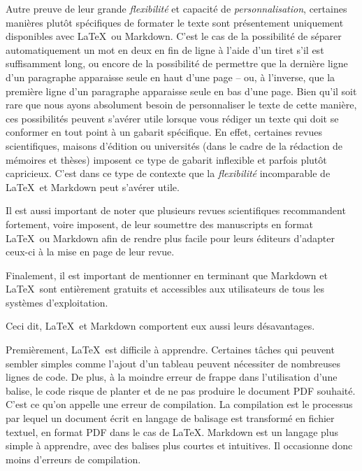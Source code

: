 \documentclass[
  letterpaper,
]{scrbook}
\begin{document}
Autre preuve de leur grande \emph{flexibilité} et capacité de
\emph{personnalisation}, certaines manières plutôt spécifiques de
formater le texte sont présentement uniquement disponibles avec
\LaTeX~ou Markdown. C'est le cas de la possibilité de séparer
automatiquement un mot en deux en fin de ligne à l'aide d'un tiret s'il
est suffisamment long, ou encore de la possibilité de permettre que la
dernière ligne d'un paragraphe apparaisse seule en haut d'une page --
ou, à l'inverse, que la première ligne d'un paragraphe apparaisse seule
en bas d'une page. Bien qu'il soit rare que nous ayons absolument besoin
de personnaliser le texte de cette manière, ces possibilités peuvent
s'avérer utile lorsque vous rédiger un texte qui doit se conformer en
tout point à un gabarit spécifique. En effet, certaines revues
scientifiques, maisons d'édition ou universités (dans le cadre de la
rédaction de mémoires et thèses) imposent ce type de gabarit inflexible
et parfois plutôt capricieux. C'est dans ce type de contexte que la
\emph{flexibilité} incomparable de \LaTeX~et Markdown peut s'avérer
utile.

Il est aussi important de noter que plusieurs revues scientifiques
recommandent fortement, voire imposent, de leur soumettre des
manuscripts en format \LaTeX~ou Markdown afin de rendre plus facile pour
leurs éditeurs d'adapter ceux-ci à la mise en page de leur revue.

Finalement, il est important de mentionner en terminant que Markdown et
\LaTeX~sont entièrement gratuits et accessibles aux utilisateurs de tous
les systèmes d'exploitation.

Ceci dit, \LaTeX~et Markdown comportent eux aussi leurs désavantages.

Premièrement, \LaTeX~est difficile à apprendre. Certaines tâches qui
peuvent sembler simples comme l'ajout d'un tableau peuvent nécessiter de
nombreuses lignes de code. De plus, à la moindre erreur de frappe dans
l'utilisation d'une balise, le code risque de planter et de ne pas
produire le document PDF souhaité. C'est ce qu'on appelle une erreur de
compilation. La compilation est le processus par lequel un document
écrit en langage de balisage est transformé en fichier textuel, en
format PDF dans le cas de \LaTeX. Markdown est un langage plus simple à
apprendre, avec des balises plus courtes et intuitives. Il occasionne
donc moins d'erreurs de compilation.
\end{document}
